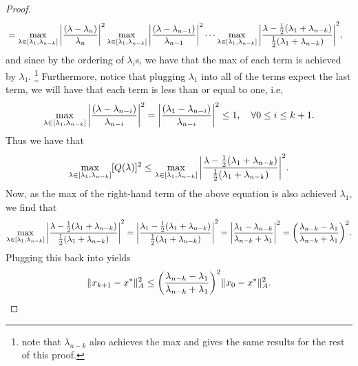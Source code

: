 \documentclass[12pt]{report}
\begin{document}
\begin{problem}
\begin{proof}
\begin{align*}
     &= \max_{\lambda \in [\lambda_1,\lambda_{n-k}]}{\left|\frac{(\lambda - \lambda_n)}{\lambda_n}\right|}^2\max_{\lambda \in [\lambda_1,\lambda_{n-k}]}{\left|\frac{(\lambda - \lambda_{n-1})}{\lambda_{n-1}}\right|}^2 \cdots \max_{\lambda \in [\lambda_1,\lambda_{n-k}]}{\left|\frac{\lambda - \frac{1}{2}(\lambda_1 + \lambda_{n-k})}{\frac{1}{2}(\lambda_1 + \lambda_{n-k})}\right|}^2,
\end{align*}
and since by the ordering of $\lambda_i$s, we have that the max of each term is achieved by $\lambda_1$. \footnote{note that $\lambda_{n-k}$ also achieves the max and gives the same results for the rest of this proof.} Furthermore, notice that plugging $\lambda_1$ into all of the terms expect the last term, we will have that each term is less than or equal to one, i.e, 
\[
     \max_{\lambda \in [\lambda_1,\lambda_{n-k}]}{\left|\frac{(\lambda - \lambda_{n-i})}{\lambda_{n-i}}\right|}^2 = {\left|\frac{(\lambda_1 - \lambda_{n-i})}{\lambda_{n-i}}\right|}^2 \leq 1, \quad \forall 0 \leq i \leq k+1.
\]
Thus we have that
\[
     \max_{\lambda \in [\lambda_1,\lambda_{n-k}]}[Q(\lambda)]^2 \leq \max_{\lambda \in [\lambda_1,\lambda_{n-k}]}{\left|\frac{\lambda - \frac{1}{2}(\lambda_1 + \lambda_{n-k})}{\frac{1}{2}(\lambda_1 + \lambda_{n-k})}\right|}^2.
\]
Now, as the max of the right-hand term of the above equation is also achieved $\lambda_{1}$, we find that
\[
     \max_{\lambda \in [\lambda_1,\lambda_{n-k}]}{\left|\frac{\lambda - \frac{1}{2}(\lambda_1 + \lambda_{n-k})}{\frac{1}{2}(\lambda_1 + \lambda_{n-k})}\right|}^2 = {\left|\frac{\lambda_{1} - \frac{1}{2}(\lambda_1 + \lambda_{n-k})}{\frac{1}{2}(\lambda_1 + \lambda_{n-k})}\right|}^2 = {\left|\frac{\lambda_1-\lambda_{n-k}}{\lambda_{n-k} + \lambda_1}\right|}^2 = {\left(\frac{\lambda_{n-k}-\lambda_1}{\lambda_{n-k} + \lambda_1}\right)}^2.
\]
Plugging this back into  yields
\[
     \|x_{k+1} - x^* \|_A^2 \leq {\left(\frac{\lambda_{n-k}-\lambda_1}{\lambda_{n-k} + \lambda_1}\right)}^2 \|x_{0} - x^* \|_A^2.
\]



\end{proof}
\end{problem}



\end{document}
